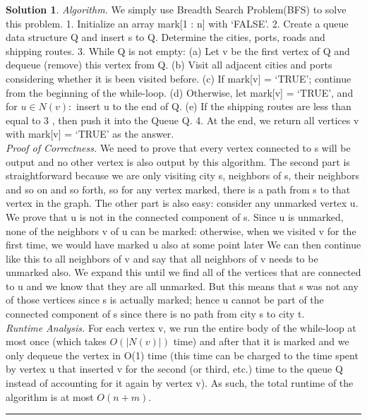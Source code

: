 \documentclass{article}
\theoremstyle{definition}
\def\fline{\rule{0.75\linewidth}{0.5pt}}
\newcommand{\finishline}{\begin{center}\fline\end{center}}
\newtheorem*{solution*}{Solution}
\newenvironment{solution}{\begin{solution*}}{{\finishline} \end{solution*}}
\begin{document}
\begin{solution}

	\emph{Algorithm.} We simply use Breadth Search Problem(BFS) to solve this problem. 1. Initialize an array mark[1 : n] with ‘FALSE’. 
	2. Create a queue data structure Q and insert s to Q. Determine the cities, ports, roads and shipping routes.
	3. While Q is not empty: (a) Let v be the first vertex of Q and dequeue (remove) this vertex from Q. (b) Visit all adjacent cities and ports considering whether it is been visited before. (c) If mark[v] = ‘TRUE’; continue from the beginning of the while-loop. (d) Otherwise, let mark[v] = ‘TRUE’, and for $u \in N(v):$ insert u to the end of Q. (e) If the shipping routes are less than equal to 3 , then push it into the Queue Q.
	4. At the end, we return all vertices v with mark[v] = ‘TRUE’ as the answer. \\

	\emph{Proof of Correctness.} We need to prove that every vertex connected to s will be output and no other vertex is also output by this algorithm. The second part is straightforward because we are only visiting city s, neighbors of s, their neighbors and so on and so forth, so for any vertex marked, there is a path from s to that vertex in the graph. The other part is also easy: consider any unmarked vertex u. We prove that u is not in the connected component of s. Since u is unmarked, none of the neighbors v of u can be marked: otherwise, when we visited v for the first time, we would have marked u also at some point later We can then continue like this to all neighbors of v  and say that all neighbors of v needs to be unmarked also. We expand this until we find all of the vertices that are connected to u and we know that they are all unmarked. But this means that s was not any of those vertices since s is actually marked; hence u cannot be part of the connected component of s since there is no path from city s to city t. \\

	\emph{Runtime Analysis.} For each vertex v, we run the entire body of the while-loop at most once (which takes $O(|N(v)|)$ time) and after that it is marked and we only dequeue the vertex in O(1) time (this time can be charged to the time spent by vertex u that inserted v for the second (or third, etc.) time to the queue Q instead of accounting for it again by vertex v). As such, the total runtime of the algorithm is at most $O(n + m)$. \\
	
\end{solution}	
\end{document}
